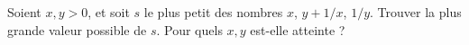 Soient $x, y > 0$, et soit $s$ le plus petit des nombres $x$, $y + 1/x$, $1/y$. Trouver la plus grande valeur possible de $s$. Pour quels $x, y$ est-elle atteinte ?
